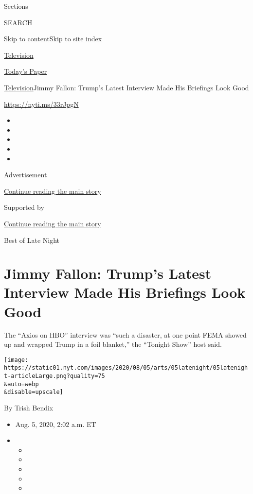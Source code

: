 Sections

SEARCH

\protect\hyperlink{site-content}{Skip to
content}\protect\hyperlink{site-index}{Skip to site index}

\href{https://www.nytimes.com/section/arts/television}{Television}

\href{https://myaccount.nytimes.com/auth/login?response_type=cookie\&client_id=vi}{}

\href{https://www.nytimes.com/section/todayspaper}{Today's Paper}

\href{/section/arts/television}{Television}\textbar{}Jimmy Fallon:
Trump's Latest Interview Made His Briefings Look Good

\url{https://nyti.ms/33rJpgN}

\begin{itemize}
\item
\item
\item
\item
\item
\end{itemize}

Advertisement

\protect\hyperlink{after-top}{Continue reading the main story}

Supported by

\protect\hyperlink{after-sponsor}{Continue reading the main story}

Best of Late Night

\hypertarget{jimmy-fallon-trumps-latest-interview-made-his-briefings-look-good}{%
\section{Jimmy Fallon: Trump's Latest Interview Made His Briefings Look
Good}\label{jimmy-fallon-trumps-latest-interview-made-his-briefings-look-good}}

The ``Axios on HBO'' interview was ``such a disaster, at one point FEMA
showed up and wrapped Trump in a foil blanket,'' the ``Tonight Show''
host said.

\texttt{[image: https://static01.nyt.com/images/2020/08/05/arts/05latenight/05latenight-articleLarge.png?quality=75\\\&auto=webp\\\&disable=upscale]}

By Trish Bendix

\begin{itemize}
\item
  Aug. 5, 2020, 2:02 a.m. ET
\item
  \begin{itemize}
  \item
  \item
  \item
  \item
  \item
  \end{itemize}
\end{itemize}

